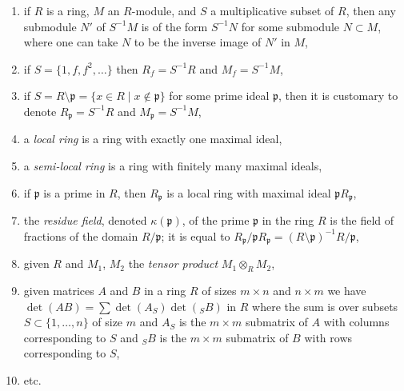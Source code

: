 \begin{enumerate}
\item
\label{item-submodule-in-localization}
if $R$ is a ring, $M$ an $R$-module, and $S$ a multiplicative
subset of $R$, then any submodule $N'$ of $S^{-1}M$ is of the form
$S^{-1}N$ for some submodule $N \subset M$, where
one can take $N$ to be the inverse image of $N'$ in $M$,
\item if $S = \{1, f, f^2, \ldots\}$ then $R_f = S^{-1}R$ and $M_f = S^{-1}M$,
\label{item-localize-f}
\item
\label{item-localize-p}
if $S = R \setminus \mathfrak p = \{x\in R \mid x\not\in \mathfrak p\}$
for some prime ideal $\mathfrak p$,
then it is customary to denote $R_{\mathfrak p} = S^{-1}R$
and $M_{\mathfrak p} = S^{-1}M$,
\item a {\it local ring} is a ring with exactly one maximal ideal,
\label{item-local-ring}
\item a {\it semi-local ring} is a ring with finitely many maximal ideals,
\label{item-semi-local-ring}
\item
\label{item-localize-p-local-ring}
if $\mathfrak p$ is a prime in $R$, then $R_{\mathfrak p}$ is
a local ring with maximal ideal $\mathfrak p R_{\mathfrak p}$,
\item
\label{item-residue-field}
the {\it residue field}, denoted $\kappa(\mathfrak p)$,
of the prime $\mathfrak p$ in the ring $R$ is the
field of fractions of the domain $R/\mathfrak p$;
it is equal to $R_\mathfrak p/\mathfrak pR_\mathfrak p
= (R \setminus \mathfrak p)^{-1}R/\mathfrak p$,
\item given $R$ and $M_1$, $M_2$ the {\it tensor product} $M_1 \otimes_R M_2$,
\label{item-tensor-product}
\item
\label{item-cauchy-binet}
given matrices $A$ and $B$ in a ring $R$ of sizes $m \times n$ and
$n \times m$ we have $\det(AB) = \sum \det(A_S)\det({}_SB)$ in $R$ where
the sum is over subsets $S \subset \{1, \ldots, n\}$ of size $m$
and $A_S$ is the $m \times m$ submatrix of $A$ with columns
corresponding to $S$ and ${}_SB$ is the $m \times m$ submatrix of $B$
with rows corresponding to $S$,
\item etc.
\end{enumerate}




